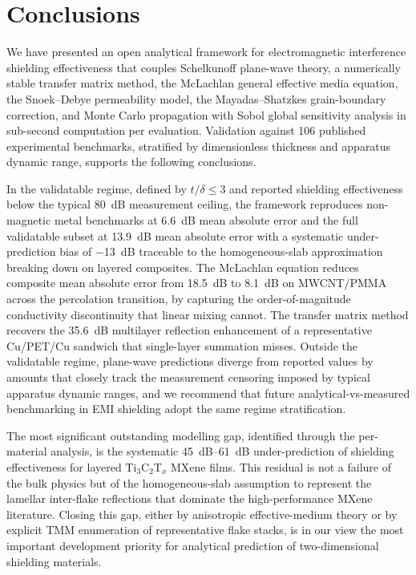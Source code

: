 \documentclass[review,3p,authoryear]{elsarticle}
\begin{document}
\section{Conclusions}
\label{sec:conclusions}

We have presented an open analytical framework for electromagnetic interference shielding effectiveness that couples Schelkunoff plane-wave theory, a numerically stable transfer matrix method, the McLachlan general effective media equation, the Snoek--Debye permeability model, the Mayadas--Shatzkes grain-boundary correction, and Monte Carlo propagation with Sobol global sensitivity analysis in sub-second computation per evaluation. Validation against \num{106} published experimental benchmarks, stratified by dimensionless thickness and apparatus dynamic range, supports the following conclusions.

In the validatable regime, defined by $t/\delta \leq 3$ and reported shielding effectiveness below the typical \SI{80}{dB} measurement ceiling, the framework reproduces non-magnetic metal benchmarks at \SI{6.6}{dB} mean absolute error and the full validatable subset at \SI{13.9}{dB} mean absolute error with a systematic under-prediction bias of \SI{-13}{dB} traceable to the homogeneous-slab approximation breaking down on layered composites. The McLachlan equation reduces composite mean absolute error from \SI{18.5}{dB} to \SI{8.1}{dB} on MWCNT/PMMA across the percolation transition, by capturing the order-of-magnitude conductivity discontinuity that linear mixing cannot. The transfer matrix method recovers the \SI{35.6}{dB} multilayer reflection enhancement of a representative Cu/PET/Cu sandwich that single-layer summation misses. Outside the validatable regime, plane-wave predictions diverge from reported values by amounts that closely track the measurement censoring imposed by typical apparatus dynamic ranges, and we recommend that future analytical-vs-measured benchmarking in EMI shielding adopt the same regime stratification.

The most significant outstanding modelling gap, identified through the per-material analysis, is the systematic \SI{45}{dB}--\SI{61}{dB} under-prediction of shielding effectiveness for layered $\mathrm{Ti}_3\mathrm{C}_2\mathrm{T}_x$ MXene films. This residual is not a failure of the bulk physics but of the homogeneous-slab assumption to represent the lamellar inter-flake reflections that dominate the high-performance MXene literature. Closing this gap, either by anisotropic effective-medium theory or by explicit TMM enumeration of representative flake stacks, is in our view the most important development priority for analytical prediction of two-dimensional shielding materials.
\end{document}
